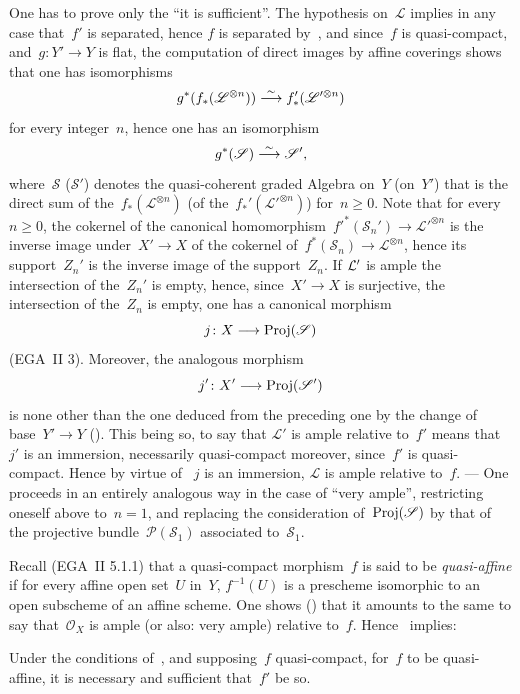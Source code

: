 One has to prove only the ``it is sufficient''. The hypothesis
on~$\mathcal{L}$ implies in any case that~$f'$ is separated,
hence $f$ is separated by~, and since~$f$ is
quasi-compact, and~$g\colon Y'\to Y$ is flat, the computation of direct
images by affine coverings shows that one has isomorphisms
$$
g^*(f_*(\mathscr{L}^{\otimes n}))\overset{\sim}{\longrightarrow}
f_*'(\mathscr{L}'^{\otimes n})
$$
for every integer~$n$, hence one has an isomorphism
$$
g^*(\mathscr{S})\overset{\sim}{\longrightarrow} \mathscr{S}',
$$
where~$\mathcal{S}$ (\resp $\mathcal{S}'$) denotes the quasi-coherent
graded Algebra on~$Y$ (\resp on~$Y'$) that is the direct sum
of the~$f_*(\mathcal{L}^{\otimes n})$
(\resp of the~$f_*'(\mathcal{L}'^{\otimes n})$) for~$n\geq
0$. Note that for every~$n\geq 0$, the cokernel of the
canonical homomorphism~$f'^*(\mathcal{S}_{n}')\to \mathcal{L}'^{\otimes n}$
is the inverse image under~$X'\to X$ of the cokernel
of~$f^*(\mathcal{S}_{n})\to \mathcal{L}^{\otimes n}$, hence its
support~$Z_{n}'$ is the inverse image of the support~$Z_{n}$. If
$\cal{L}'$
is ample the intersection of the~$Z_{n}'$ is empty, hence, since~$X'\to X$
is surjective, the intersection of the~$Z_{n}$ is empty, \ie one has a
canonical morphism
$$
j\colon X\to \Proj(\mathcal{S})
$$
(EGA~II 3). Moreover, the analogous morphism
$$
j'\colon X'\to \Proj(\mathcal{S}')
$$
is none other than the one deduced from the preceding one by the
change of base~$Y'\to Y$ (\loccit). This being so, to say that
$\mathcal{L}'$ is ample relative to~$f'$ means that~$j'$ is
an immersion, necessarily quasi-compact moreover,
since~$f'$ is quasi-compact. Hence by virtue of~ $j$
is an immersion, \ie $\mathcal{L}$ is ample relative
to~$f$. --- One proceeds in an entirely analogous way in the case
of ``very
ample'', restricting oneself above to~$n=1$, and replacing the
consideration of~$\operatorname{Proj}(\mathscr{S})$ by that of the projective
bundle~$\mathcal{P}(\mathcal{S}_{1})$ associated
to~$\mathcal{S}_{1}$.

Recall (EGA~II 5.1.1) that a quasi-compact morphism~$f$ is said to be
\emph{quasi-affine} if for every affine open set~$U$ in~$Y$,
$f^{-1}(U)$ is a prescheme isomorphic to an
open subscheme of an affine scheme. One shows (\loccit)
that it amounts to the same to say that~$\mathcal{O}_{X}$ is ample (or
also: very ample) relative to~$f$. Hence~
implies:

\begin{corollary}
\label{VIII.5.9}
Under the conditions of~, and supposing~$f$ quasi-compact,
for~$f$ to be quasi-affine, it is necessary and sufficient that~$f'$ be so.
\end{corollary}

